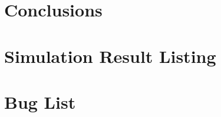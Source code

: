 \documentclass{report}
\begin{document}
\chapter{Conclusions}



\appendix

\chapter{Simulation Result Listing}


%

\chapter{Bug List}


\nocite{*}
\end{document}
